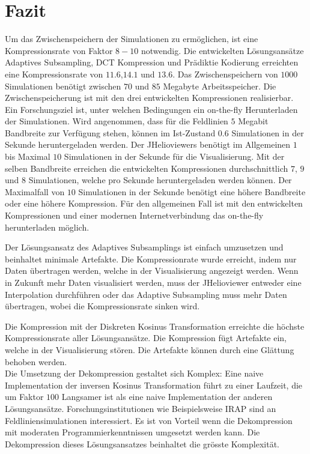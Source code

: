 \section{Fazit}
Um das Zwischenspeichern der Simulationen zu ermöglichen, ist eine Kompressionsrate von Faktor $8-10$ notwendig. Die entwickelten Lösungsansätze Adaptives Subsampling, DCT Kompression und Prädiktie Kodierung erreichten eine Kompressionsrate von $11.6$,$14.1$ und $13.6$. Das Zwischenspeichern von $1000$ Simulationen benötigt zwischen $70$ und $85$ Megabyte Arbeitsspeicher. Die Zwischenspeicherung ist mit den drei entwickelten Kompressionen realisierbar.\\
Ein Forschungsziel ist, unter welchen Bedingungen ein on-the-fly Herunterladen der Simulationen. Wird angenommen, dass für die Feldlinien $5$ Megabit Bandbreite zur Verfügung stehen, können im Ist-Zustand $0.6$ Simulationen in der Sekunde heruntergeladen werden. Der JHelioviewers benötigt im Allgemeinen $1$ bis Maximal $10$ Simulationen in der Sekunde für die Visualisierung. Mit der selben Bandbreite erreichen die entwickelten Kompressionen durchschnittlich $7$, $9$ und $8$ Simulationen, welche pro Sekunde heruntergeladen werden können. Der Maximalfall von $10$ Simulationen in der Sekunde benötigt eine höhere Bandbreite oder eine höhere Kompression. Für den allgemeinen Fall ist mit den entwickelten Kompressionen und einer modernen Internetverbindung das on-the-fly herunterladen möglich. 
 
Der Lösungsansatz des Adaptives Subsamplings ist einfach umzusetzen und beinhaltet minimale Artefakte. Die Kompressionrate wurde erreicht, indem nur Daten übertragen werden, welche in der Visualisierung angezeigt werden. Wenn in Zukunft mehr Daten visualisiert werden, muss der JHelioviewer entweder eine Interpolation durchführen oder das Adaptive Subsampling muss mehr Daten übertragen, wobei die Kompressionsrate sinken wird.

Die Kompression mit der Diskreten Kosinus Transformation erreichte die höchste Kompressionsrate aller Lösungsansätze. Die Kompression fügt Artefakte ein, welche in der Visualisierung stören. Die Artefakte können durch eine Glättung behoben werden.\\
Die Umsetzung der Dekompression gestaltet sich Komplex: Eine naive Implementation der inversen Kosinus Transformation führt zu einer Laufzeit, die um Faktor $100$ Langsamer ist als eine naive Implementation der anderen Lösungsansätze. Forschungsinstitutionen wie Beispielsweise IRAP\cite{website:irap} sind an Feldliniensimulationen interessiert. Es ist von Vorteil wenn die Dekompression mit moderaten Programmierkenntnissen umgesetzt werden kann. Die Dekompression dieses Lösungsansatzes beinhaltet die grösste Komplexität.

